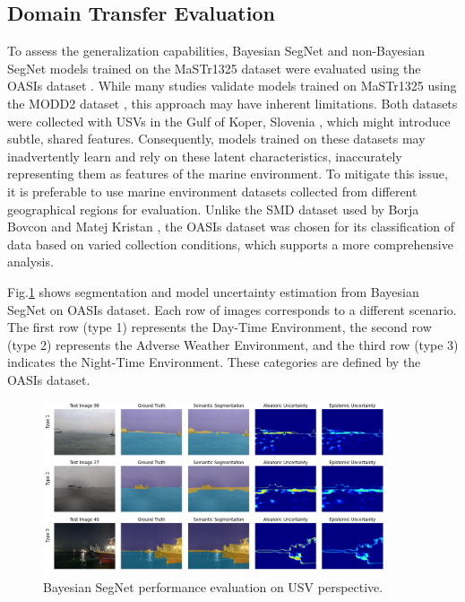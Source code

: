 \subsection{Domain Transfer Evaluation}
\label{section:DTE}
To assess the generalization capabilities, Bayesian SegNet and non-Bayesian SegNet models trained on the 
MaSTr1325 dataset were evaluated using the OASIs dataset \cite{OASIs}. While many studies validate models trained 
on MaSTr1325 using the MODD2 dataset \cite{MODS,MODD2,WaSR}, this approach may have inherent limitations. Both 
datasets 
were collected with USVs in the Gulf of Koper, Slovenia \cite{MaSTr1325}, which might introduce subtle, shared 
features. Consequently, models trained on these datasets may inadvertently learn and rely on these latent 
characteristics, inaccurately representing them as features of the marine environment. To mitigate this issue, 
it is preferable to use marine environment datasets collected from different geographical regions for evaluation. 
Unlike the SMD dataset used by Borja Bovcon and Matej Kristan \cite{WaSR}, the OASIs dataset was chosen for its 
classification of data based on varied collection conditions, which supports a more comprehensive analysis. 

Fig.\ref{fig:bs-oasis-usv} shows segmentation and model uncertainty estimation from Bayesian SegNet 
on OASIs dataset. Each row of images corresponds to a different scenario. The first row (type 1) represents the 
Day-Time Environment, the second row (type 2) represents the Adverse Weather Environment, and the third row (type 3) 
indicates the Night-Time Environment. These categories are defined by the OASIs dataset.
\begin{figure}[ht!]
    \centering
    \includegraphics[width=0.9\textwidth]{figures/OASIs/BayesianSegNet-usv-panel.png}
    \caption{Bayesian SegNet performance evaluation on USV perspective.}
    \label{fig:bs-oasis-usv}
\end{figure} 

